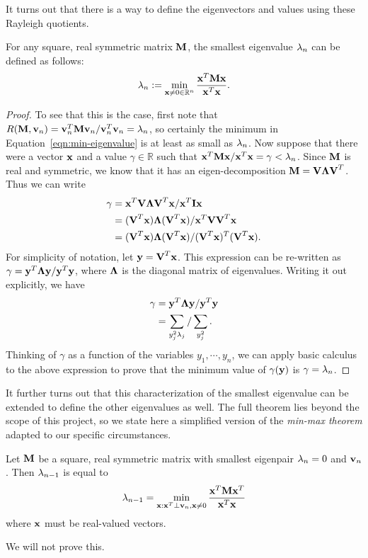 It turns out that there is a way to define the eigenvectors and values using these Rayleigh quotients.
\begin{proposition}
  For any square, real symmetric matrix $\textbf{M}$, the smallest eigenvalue $\lambda_n$ can be defined as follows:
  \begin{equation}\label{eqn:min-eigenvalue}
    \lambda_n := \min_{\textbf{x} \neq 0 \in \mathbb{R}^n} \frac{\textbf{x}^T\textbf{M}\textbf{x}}{\textbf{x}^T\textbf{x}}.
  \end{equation}
\end{proposition}
\begin{proof}
  To see that this is the case, first note that $R(\textbf{M},\textbf{v}_n) = \textbf{v}_n^T\textbf{M}\textbf{v}_n / \textbf{v}_n^T\textbf{v}_n = \lambda_n$, so certainly the minimum in Equation~\eqref{eqn:min-eigenvalue} is at least as small as $\lambda_n$.
  Now suppose that there were a vector $\textbf{x}$ and a value $\gamma \in \mathbb{R}$ such that $\textbf{x}^T\textbf{M}\textbf{x}/\textbf{x}^T\textbf{x} = \gamma < \lambda_n$. Since $\textbf{M}$ is real and symmetric, we know that it has an eigen-decomposition $\textbf{M} = \textbf{V}\boldsymbol{\Lambda}\textbf{V}^T$. Thus we can write
  \begin{align}
    \gamma &= \textbf{x}^T\textbf{V} \boldsymbol{\Lambda} \textbf{V}^T\textbf{x} / \textbf{x}^T\textbf{I} \textbf{x} \\
    &= (\textbf{V}^T\textbf{x})\boldsymbol{\Lambda}(\textbf{V}^T\textbf{x}) / \textbf{x}^T\textbf{V}\textbf{V}^T\textbf{x} \\
    &= (\textbf{V}^T\textbf{x})\boldsymbol{\Lambda}(\textbf{V}^T\textbf{x}) / (\textbf{V}^T\textbf{x})^T (\textbf{V}^T\textbf{x}).
  \end{align}
  For simplicity of notation, let $\textbf{y} = \textbf{V}^T\textbf{x}$. This expression can be re-written as $\gamma = \textbf{y}^T\boldsymbol{\Lambda}\textbf{y} / \textbf{y}^T\textbf{y}$, where $\boldsymbol{\Lambda}$ is the diagonal matrix of eigenvalues. Writing it out explicitly, we have
  \begin{align}
    \gamma &= \textbf{y}^T\boldsymbol{\Lambda}\textbf{y} / \textbf{y}^T\textbf{y} \\
    &= \sum_{y_j^2 \lambda_j} / \sum_{y_j^2}.
  \end{align}
  Thinking of $\gamma$ as a function of the variables $y_1, \cdots, y_n$, we can apply basic calculus to the above expression to prove that the minimum value of $\gamma(\textbf{y})$ is $\gamma = \lambda_n$.
\end{proof}

It further turns out that this characterization of the smallest eigenvalue can be extended to define the other eigenvalues as well.
The full theorem lies beyond the scope of this project, so we state here a simplified version of the \emph{min-max theorem} adapted to our specific circumstances.

\begin{proposition}\label{thm:second-smallest-eig}
  Let $\textbf{M}$ be a square, real symmetric matrix with smallest eigenpair $\lambda_n = 0$ and $\textbf{v}_n$. Then $\lambda_{n-1}$ is equal to
  \begin{equation}
    \lambda_{n-1} = \min_{ \textbf{x}: \textbf{x}^T \perp \textbf{v}_n, \textbf{x} \neq 0} \frac{\textbf{x}^T \textbf{M} \textbf{x}^T}{\textbf{x}^T\textbf{x}}
  \end{equation}
  where $\textbf{x}$ must be real-valued vectors.
\end{proposition}
We will not prove this.

